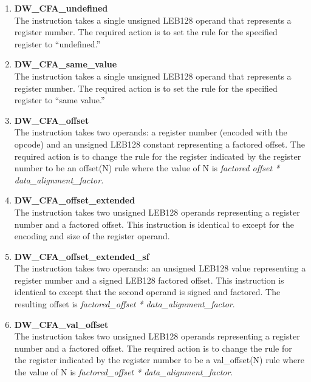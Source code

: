 \begin{enumerate}[1.]
\item \textbf{DW\-\_CFA\-\_undefined} \\
The  instruction takes a single unsigned
LEB128 operand that represents a register number. The required
action is to set the rule for the specified register to
``undefined.''

\item \textbf{DW\-\_CFA\-\_same\-\_value} \\
The  instruction takes a single unsigned
LEB128 operand that represents a register number. The required
action is to set the rule for the specified register to
``same value.''

\item \textbf{DW\-\_CFA\-\_offset} \\
The  instruction takes two operands: a register
number (encoded with the opcode) and an unsigned LEB128
constant representing a factored offset. The required action
is to change the rule for the register indicated by the
register number to be an offset(N) rule where the value of
N is 
\textit{factored offset * data\_alignment\_factor.}

\item \textbf{DW\-\_CFA\-\_offset\-\_extended} \\
The  instruction takes two unsigned
LEB128 operands representing a register number and a factored
offset. This instruction is identical to  except
for the encoding and size of the register operand.

\item \textbf{ DW\-\_CFA\-\_offset\-\_extended\-\_sf} \\
The  instruction takes two operands:
an unsigned LEB128 value representing a register number and a
signed LEB128 factored offset. This instruction is identical
to  except that the second operand is
signed and factored. The resulting offset is 
\textit{factored\_offset * data\_alignment\_factor}.

\item \textbf{DW\-\_CFA\-\_val\-\_offset} \\
The  instruction takes two unsigned
LEB128 operands representing a register number and a
factored offset. The required action is to change the rule
for the register indicated by the register number to be a
val\_offset(N) rule where the value of N is 
\textit{factored\_offset * data\_alignment\_factor}.


\end{enumerate}
